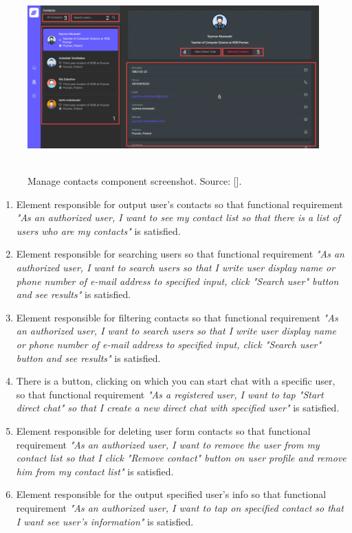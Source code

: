 \begin{figure}[H]
    \centering
    \includegraphics[width=1\textwidth]{Pictures/10_Messenger_manage_contacts}
    ~\caption{Manage contacts component screenshot. Source: [\cite{mango2021figma}].}\label{fig:figure10}
\end{figure}
\begin{enumerate}
    \item Element responsible for output user's contacts so that functional requirement
    \textit{"As an authorized user, I want to see my contact list so that there is a list of users
    who are my contacts"} is satisfied.
    \item Element responsible for searching users so that functional requirement
    \textit{"As an authorized user, I want to search users so that I write user display name or phone number
    of e-mail address to specified input, click "Search user" button and see
    results"} is satisfied.
    \item Element responsible for filtering contacts so that functional requirement
    \textit{"As an authorized user, I want to search users so that I write user display name or phone number of e-mail
    address to specified input, click "Search user" button and see results"} is satisfied.
    \item There is a button, clicking on which you can start chat with a specific user, so that functional requirement
    \textit{"As a registered user, I want to tap "Start direct chat" so that I create a new direct
    chat with specified user"} is satisfied.
    \item Element responsible for deleting user form contacts so that functional requirement
    \textit{"As an authorized user, I want to remove the user from my contact list so that I click "Remove contact"
    button on user profile and remove him from my contact list"} is satisfied.
    \item Element responsible for the output specified user's info so that functional requirement
    \textit{"As an authorized user, I want to tap on specified contact so that I want see user's information"}
    is satisfied.
\end{enumerate}

